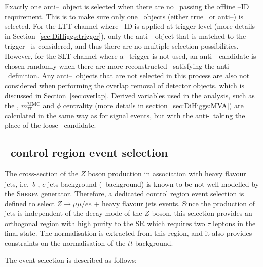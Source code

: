 Exactly one anti--\tauhad\ object is selected when there are no \tauhad\
passing the offline \tauhad--ID requirement. 
This is to make sure only one \tauhad\ objects (either true \tauhad\ or
anti--\tauhad) is selected.
For the LTT channel where \tauhad--ID is applied at trigger level 
(more details in Section~\ref{sec:DiHiggs:trigger}),
only the anti--\tauhad\ object that is matched to the
trigger \tauhad\ is considered, and thus there are 
no multiple selection possibilities. 
However, for the SLT channel where a \tauhad\ trigger is not used, 
an anti--\tauhad\ candidate is chosen randomly 
when there are more reconstructed
\tauhad\ satisfying the anti--\tauhad\ definition. 
Any anti--\tauhad\ objects that are not selected in this process are also not
considered when performing the overlap removal of detector objects, 
which is discussed in Section~\ref{sec:overlap}.
Derived variables used in the analysis, such as the 
\MET, $m^{\mathrm{MMC}}_{\tau\tau}$ and \MET$\phi$ centrality
(more details in section~\ref{sec:DiHiggs:MVA})
are calculated in the same way as for signal events, 
but with the anti-\tauhad\ taking the place of the loose \tauhad\ candidate.


\subsection{\ZHF\ control region event selection}
\label{sec:selection:zcr}


The cross-section of the $Z$ boson production in association 
with heavy flavour jets, i.e.\ $b$-, $c$-jets background (\ZHF\ background) 
is known to be 
not well modelled by the \textsc{Sherpa} generator. 
Therefore, a dedicated control region event selection is defined
to select $Z \rightarrow \mu \mu / e e$ + heavy flavour jets events. 
Since the production of jets is independent of the decay mode 
of the $Z$ boson, this selection provides an orthogonal region with 
high purity to the SR which requires two $\tau$ leptons in the final state.  
The normalisation is extracted from this region,
and it also provides constraints 
on the normalisation of the $t\bar t$ background. 

The event selection is described as follows:

